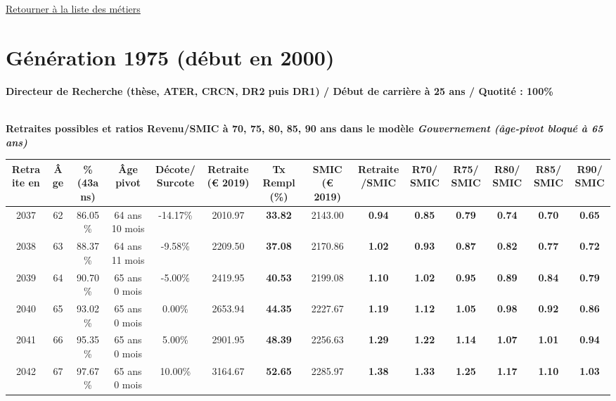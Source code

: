  \hyperlink{page.2}{\noindent Retourner à la liste des métiers}

 \newpage 

\section{Génération 1975 (début en 2000)\label{DR_100_1975_25_0}} 
 
{\bf \noindent Directeur de Recherche (thèse, ATER, CRCN, DR2 puis DR1) / Début de carrière à 25 ans / Quotité : 100\%}  ~ 

 ~\\{\bf \noindent Retraites possibles et ratios Revenu/SMIC à 70, 75, 80, 85, 90 ans dans le modèle \emph{Gouvernement (âge-pivot bloqué à 65 ans)}}  
 
\begin{adjustbox}{max width=\textwidth} 
\begin{tabular}[htb]{|c|c||c|c|c||c|c||c|c||c|c|c|c|c|} 
\hline 
 Retraite en &  Âge &  \%(43ans) &  Âge pivot &  Décote/Surcote &  Retraite (\euro{} 2019) &  Tx Rempl(\%) &  SMIC (\euro{} 2019) &  Retraite/SMIC &  R70/SMIC &  R75/SMIC &  R80/SMIC &  R85/SMIC &  R90/SMIC \\ 
\hline \hline 
 2037 &  62 &  86.05\% &  64 ans 10 mois &  -14.17\% &  2010.97 &  {\bf 33.82} &  2143.00 &  {\bf {\color{red} 0.94}} &  {\bf {\color{red} 0.85}} &  {\bf {\color{red} 0.79}} &  {\bf {\color{red} 0.74}} &  {\bf {\color{red} 0.70}} &  {\bf {\color{red} 0.65}} \\ 
\hline 
 2038 &  63 &  88.37\% &  64 ans 11 mois &  -9.58\% &  2209.50 &  {\bf 37.08} &  2170.86 &  {\bf 1.02} &  {\bf {\color{red} 0.93}} &  {\bf {\color{red} 0.87}} &  {\bf {\color{red} 0.82}} &  {\bf {\color{red} 0.77}} &  {\bf {\color{red} 0.72}} \\ 
\hline 
 2039 &  64 &  90.70\% &  65 ans 0 mois &  -5.00\% &  2419.95 &  {\bf 40.53} &  2199.08 &  {\bf 1.10} &  {\bf 1.02} &  {\bf {\color{red} 0.95}} &  {\bf {\color{red} 0.89}} &  {\bf {\color{red} 0.84}} &  {\bf {\color{red} 0.79}} \\ 
\hline 
 2040 &  65 &  93.02\% &  65 ans 0 mois &  0.00\% &  2653.94 &  {\bf 44.35} &  2227.67 &  {\bf 1.19} &  {\bf 1.12} &  {\bf 1.05} &  {\bf {\color{red} 0.98}} &  {\bf {\color{red} 0.92}} &  {\bf {\color{red} 0.86}} \\ 
\hline 
 2041 &  66 &  95.35\% &  65 ans 0 mois &  5.00\% &  2901.95 &  {\bf 48.39} &  2256.63 &  {\bf 1.29} &  {\bf 1.22} &  {\bf 1.14} &  {\bf 1.07} &  {\bf 1.01} &  {\bf {\color{red} 0.94}} \\ 
\hline 
 2042 &  67 &  97.67\% &  65 ans 0 mois &  10.00\% &  3164.67 &  {\bf 52.65} &  2285.97 &  {\bf 1.38} &  {\bf 1.33} &  {\bf 1.25} &  {\bf 1.17} &  {\bf 1.10} &  {\bf 1.03} \\ 
\hline 
\hline 
\end{tabular} 
\end{adjustbox} 
 
